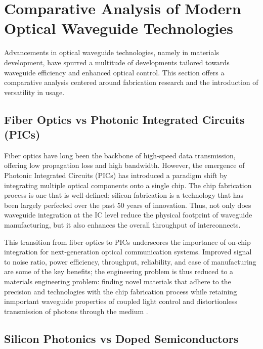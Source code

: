 \documentclass[10pt]{article}
\begin{document}
\section{Comparative Analysis of Modern Optical Waveguide Technologies}

Advancements in optical waveguide technologies, namely in materials development, have spurred a multitude of developments tailored towards waveguide efficiency and enhanced optical control. This section offers a comparative analysis centered around fabrication research and the introduction of versatility in usage.

\subsection{Fiber Optics vs Photonic Integrated Circuits (PICs)}

Fiber optics have long been the backbone of high-speed data transmission, offering low propagation loss and high bandwidth. However, the emergence of Photonic Integrated Circuits (PICs) has introduced a paradigm shift by integrating multiple optical components onto a single chip. The chip fabrication process is one that is well-defined; silicon fabrication is a technology that has been largely perfected over the past 50 years of innovation. Thus, not only does waveguide integration at the IC level reduce the physical footprint of waveguide manufacturing, but it also enhances the overall throughput of interconnects. 



This transition from fiber optics to PICs underscores the importance of on-chip integration for next-generation optical communication systems. Improved signal to noise ratio, power efficiency, throughput, reliability, and ease of manufacturing are some of the key benefits; the engineering problem is thus reduced to a 
materials engineering problem: finding novel materials that adhere to the precision and technologies with the chip fabrication process while retaining inmportant waveguide 
properties of coupled light control and distortionless transmission of photons through the medium \cite{ref02}.

\subsection{Silicon Photonics vs Doped Semiconductors}
\end{document}
